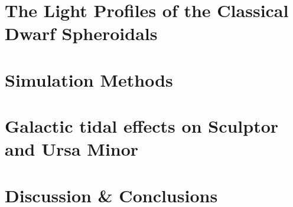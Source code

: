 \documentclass[12pt,oneside,letterpaper]{report}
\begin{document}
\chapter{The Light Profiles of the Classical Dwarf Spheroidals}\label{sec:observations}


\chapter{Simulation Methods}\label{sec:methods}


\chapter{Galactic tidal effects on Sculptor and Ursa Minor}\label{sec:results}


\chapter{Discussion \& Conclusions}\label{sec:discussion}




\newpage

 



\appendix





\end{document}

